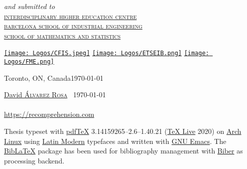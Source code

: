 \begin{titlepage}
  \large
  \textsl{and submitted to}\Large\\[-.25ex]
  \scshape
  \href{https://cfis.upc.edu/en}{interdisciplinary higher education centre}\\[-.5ex]
  \href{https://etseib.upc.edu/en}{barcelona school of industrial engineering}\\[-.5ex]
  \href{https://fme.upc.edu/en}{school of mathematics and statistics}


  \vfill
  \href{https://cfis.upc.edu/en}{\texttt{[image: Logos/CFIS.jpeg]}}
  \hspace{1em}
  \href{https://etseib.upc.edu/en}{\texttt{[image: Logos/ETSEIB.png]}}
  \hspace{1em}
  \href{https://fme.upc.edu/en}{\texttt{[image: Logos/FME.png]}}\\[1ex]

  \vfill

  \normalsize
  Toronto, ON, Canada\hfill\today
\end{titlepage}




\thispagestyle{empty}
\small
\null\vfill

\begin{center}
\end{center}

\vspace{1ex}
\noindent\href{https://david.alvarezrosa.com/}{David \textsc{Álvarez Rosa}}
\textcopyright\ \today\\
\makeatletter\href{https://recomprehension.com/}{\textsl{\@title}}\makeatother\\
\url{https://recomprehension.com}


\bigskip
\noindent Thesis typeset with
\href{http://tug.org/applications/pdftex/}{pdf\TeX{}} 3.14159265--2.6--1.40.21
(\href{https://www.tug.org/svn/texlive/}{\TeX{} Live} 2020) on
\href{https://archlinux.org/}{Arch Linux} using
\href{https://www.ctan.org/tex-archive/fonts/lm/}{Latin Modern} typefaces and
written with \href{https://www.gnu.org/software/emacs/}{GNU Emacs}. The
\href{https://www.ctan.org/pkg/biblatex}{Bib\LaTeX{}} package has been used for
bibliography management with
\href{http://biblatex-biber.sourceforge.net/}{Biber} as processing backend.

